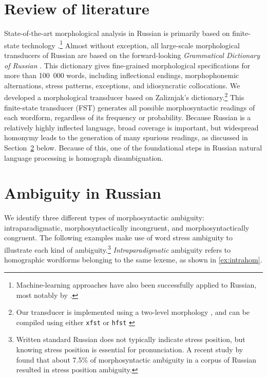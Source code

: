 \documentclass[11pt]{article}
\begin{document}
\section{Review of literature}
\label{sec:lit}
State-of-the-art morphological analysis in Russian is primarily based on
finite-state technology
\cite{Nozhov-03,Segalovich-03}.\footnote{Machine-learning approaches have also been successfully applied to Russian, most notably by 
.} Almost without exception, all large-scale 
morphological transducers of Russian are based on the
forward-looking \emph{Grammatical Dictionary of Russian} \cite{Zaliznjak-77}.
This dictionary gives fine-grained morphological specifications for more than
100~000 words, including inflectional endings, morphophonemic alternations, 
stress patterns, exceptions, and idiosyncratic collocations.
We developed a morphological transducer based on Zaliznjak's dictionary.\footnote{Our transducer is implemented using a two-level 
morphology \cite{Koskenniemi-84}, and can be compiled using either {\tt xfst}
\cite{Beesley.Karttunen-03} or {\tt hfst} \cite{hfst-11}} This finite-state transducer (FST) generates all possible 
morphosyntactic readings of each wordform, regardless of its frequency or probability. Because Russian is a relatively highly inflected language, broad coverage is important, but widespread homonymy leads to the generation of many spurious readings, as discussed in Section~\ref{ambiguity} below. Because of this, one of the foundational steps in Russian natural language processing is homograph disambiguation.






\section{Ambiguity in Russian} \label{ambiguity}

We identify three different types of morphosyntactic ambiguity: 
intraparadigmatic, morphosyntactically incongruent, and morphosyntactically 
congruent. The following examples make use of word stress ambiguity to illustrate 
each kind of ambiguity.\footnote{Written standard Russian does not typically
indicate stress position, but knowing stress position is essential for pronunciation. 
A recent study by  found that about 7.5\% of 
morphosyntactic ambiguity in a corpus of Russian resulted in stress position 
ambiguity.} \emph{Intraparadigmatic} ambiguity refers to homographic 
wordforms belonging to the same lexeme, as shown in \ref{ex:intrahom}. 
\end{document}

